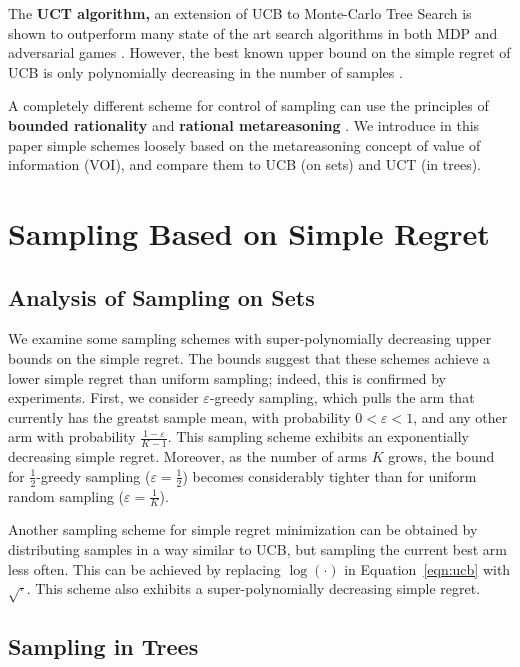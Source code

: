 \documentclass[letterpaper]{article}
\begin{document}
The {\bf UCT algorithm,} an extension of UCB
to Monte-Carlo Tree Search \cite{Kocsis.uct} is
shown to outperform many state of the art search algorithms in both
MDP and adversarial games \cite{Eyerich.ctp,GellyWang.mogo}. 
However, the best known upper bound on the simple regret of UCB is
only polynomially decreasing in the number of samples \cite{Bubeck.pure}.

A completely different scheme for control of sampling can use the
principles of {\bf bounded rationality} \cite{Horvitz.reasoningabout}
and {\bf rational metareasoning} \cite{Russell.right}. We introduce in this paper simple
schemes loosely based on the metareasoning concept of value of
information (VOI), and compare them to UCB (on sets) and UCT (in trees).


\section{Sampling Based on Simple Regret}
\label{sec:results}

\subsection{Analysis of Sampling on Sets}
\label{sec:sampling-on-sets}


We examine some sampling schemes with super-polynomially
decreasing upper bounds on the simple regret. The bounds
suggest that these schemes achieve a lower simple regret
than uniform sampling; indeed, this is confirmed
by experiments. First, we consider $\varepsilon$-greedy sampling, which
pulls the arm that currently has the greatst sample mean, with probability
$0<\varepsilon<1$, and any other arm with probability $\frac {1-\varepsilon} {K-1}$. 
This sampling scheme exhibits an exponentially decreasing simple
regret. Moreover, as the number of arms $K$ grows, the bound for $\frac 1
2$-greedy sampling ($\varepsilon=\frac 1 2$) becomes considerably tighter than for uniform
random sampling ($\varepsilon=\frac 1 K$).

Another sampling scheme for simple regret minimization can be obtained
by distributing samples in a way similar to UCB, but sampling the current best arm
less often. This can be achieved by replacing $\log(\cdot)$ in
Equation~\ref{eqn:ucb} with $\sqrt\cdot$. This scheme also exhibits
a super-polynomially decreasing simple regret.

\subsection{Sampling in Trees}
\label{sec:sampling-in-trees}
\end{document}
